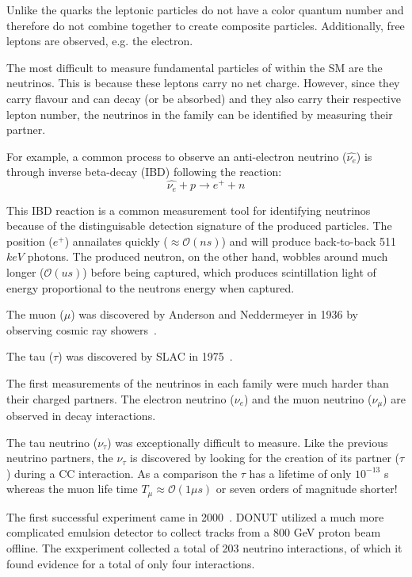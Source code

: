Unlike the quarks the leptonic particles do not have a color quantum number and therefore do not combine together to create composite particles.
Additionally, free leptons are observed, e.g. the electron.

The most difficult to measure fundamental particles of within the SM are the neutrinos.
This is because these leptons carry no net charge.
However, since they carry flavour and can decay (or be absorbed) and they also carry their respective lepton number, the neutrinos in the family can be identified by measuring their partner.

For example, a common process to observe an anti-electron neutrino ($\hat{\nu_{e}}$) is through inverse beta-decay (IBD) following the reaction:
\begin{equation}
\hat{\nu_{e}} + p \rightarrow e^{+} + n
\end{equation}

This IBD reaction is a common measurement tool for identifying neutrinos because of the distinguisable detection signature of the produced particles.
The position ($e^{+}$) annailates quickly ($\approx \mathcal{O}(ns)$) and will produce back-to-back 511 $keV$ photons.
The produced neutron, on the other hand, wobbles around much longer ($\mathcal{O}(us)$) before being captured, which produces scintillation light of energy proportional to the neutrons energy when captured.

The muon ($\mu$) was discovered by Anderson and Neddermeyer in 1936 by observing cosmic ray showers~\citep{muon_discovery_PhysRev.51.884}.

The tau ($\tau$) was discovered by SLAC in 1975~\citep{tau_discovery_PhysRevLett.35.1489}.

The first measurements of the neutrinos in each family were much harder than their charged partners.
The electron neutrino ($\nu_{e}$) and the muon neutrino ($\nu_{\mu}$) are observed in decay interactions.

The tau neutrino ($\nu_{\tau}$) was exceptionally difficult to measure.
Like the previous neutrino partners, the $\nu_{\tau}$ is discovered by looking for the creation of its partner ($\tau$) during a CC interaction.
As a comparison the $\tau$ has a lifetime of only $10^{-13}$ s whereas the muon life time $T_{\mu}\approx \mathcal{O}(1 \mu s)$ or seven orders of magnitude shorter!

The first successful experiment came in 2000~\citep{tau_neutrino_discovery_KODAMA2001218}.
DONUT utilized a much more complicated emulsion detector to collect tracks from a 800 GeV proton beam offline.
The exxperiment collected a total of 203 neutrino interactions, of which it found evidence for a total of only four interactions.

